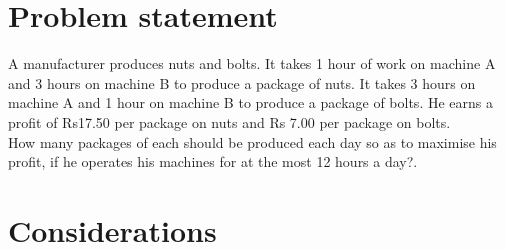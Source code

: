 \documentclass[journal,10pt,twocolumn]{article}
\begin{document}
\section{Problem statement}
\fi
A manufacturer produces nuts and bolts. It takes 1 hour of work on machine A
and 3 hours on machine B to produce a package of nuts. It takes 3 hours on
machine A and 1 hour on machine B to produce a package of bolts. He earns a
profit of Rs17.50 per package on nuts and Rs 7.00 per package on bolts.\\
How many packages of each should be produced each day so as to maximise his
profit, if he operates his machines for at the most 12 hours a day?.
\\
\solution
\iffalse
\section{Considerations}
\end{document}
